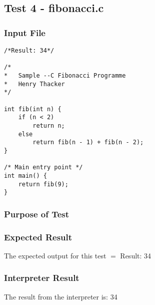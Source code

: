\subsection{Test 4 - fibonacci.c}
\subsubsection{Input File}
\begin{lstlisting}[showstringspaces=false,breaklines=true,backgroundcolor=\color{light-gray}, captionpos=b]
/*Result: 34*/

/*
*	Sample --C Fibonacci Programme
*	Henry Thacker
*/

int fib(int n) {
	if (n < 2) 
		return n;
	else
		return fib(n - 1) + fib(n - 2);
}

/* Main entry point */
int main() {
	return fib(9);
}
\end{lstlisting}\subsubsection{Purpose of Test}

\subsubsection{Expected Result}
The expected output for this test $=$ Result: 34
\subsubsection{Interpreter Result}
The result from the interpreter is: 34
